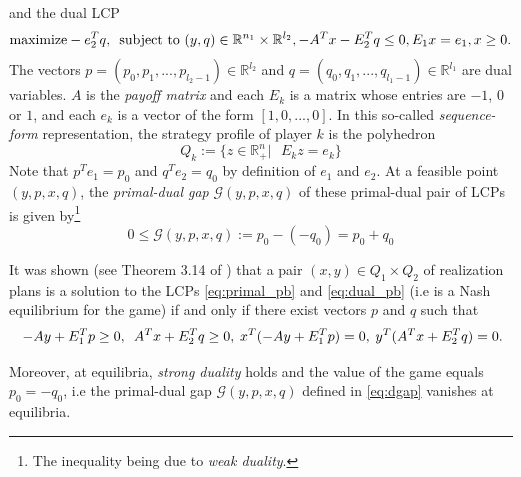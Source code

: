 \documentclass{article} %
\begin{document}
and the dual LCP
\begin{equation}
  \begin{aligned}
    \text{maximize}-e_2^Tq,\hspace{.5em}\text{subject to }(y,q) \in
    \mathbb{R}^{n_1} \times \mathbb{R}^{l_2}, -A^Tx - E_2^Tq \leq 0,
    E_1x = e_1, x \ge 0.
  \end{aligned}
  \label{eq:dual_pb}
\end{equation}
The vectors $p = (p_0, p_1, ..., p_{l_2 - 1}) \in \mathbb{R}^{l_2}$
and $q = (q_0, q_1, ..., q_{l_1 - 1}) \in \mathbb{R}^{l_1}$ are dual
variables. 
$A$ is the \textit{payoff matrix} and each $E_k$ is a matrix whose
entries are $-1$, $0$ or $1$, and each $e_k$ is a vector of the form
$[1, 0, ..., 0]$. In this so-called \textit{sequence-form}
representation, the strategy profile of player $k$ is the polyhedron
\begin{equation}
  Q_k := \{z \in \mathbb{R}^n_+ |\text{ }E_kz = e_k\}
\label{eq:polyhedron}
\end{equation}
Note that $p^Te_1 = p_0$ and $q^Te_2 = q_0$ by definition of $e_1$ and
$e_2$. At a feasible point $(y, p, x, q)$, the \textit{primal-dual gap}
$\mathcal{G}(y, p, x, q)$ of these primal-dual pair of LCPs is given
by\footnote{The inequality being due to \textit{weak duality}.}
\begin{equation}
  0 \le \mathcal{G}(y, p, x, q) := p_0 - (-q_0) = p_0 + q_0
  \label{eq:dgap}
\end{equation}

It was shown (see Theorem 3.14 of \cite{vonequilibrium}) that a pair
$(x, y) \in Q_1 \times Q_2$ of realization plans is a solution to the
LCPs \eqref{eq:primal_pb} and \eqref{eq:dual_pb} (i.e is a Nash
equilibrium for the game)  if and only if there exist vectors $p$ and
$q$ such that
\begin{equation}
\hspace{.25em} -Ay + E_1^Tp \ge 0, \hspace{.5em}A^Tx + E_2^Tq \ge
0, \hspace{.25em} x^T(-Ay + E_1^Tp) = 0, \hspace{.25em} y^T(A^Tx +
E_2^Tq) = 0.
\label{eq:feasibility}
\end{equation}

Moreover, at equilibria, \textit{strong duality} holds and the value of the game equals $p_0 = -q_0$, i.e the primal-dual gap $\mathcal{G}(y, p, x, q)$ defined in \eqref{eq:dgap} vanishes at equilibria.
\end{document}

